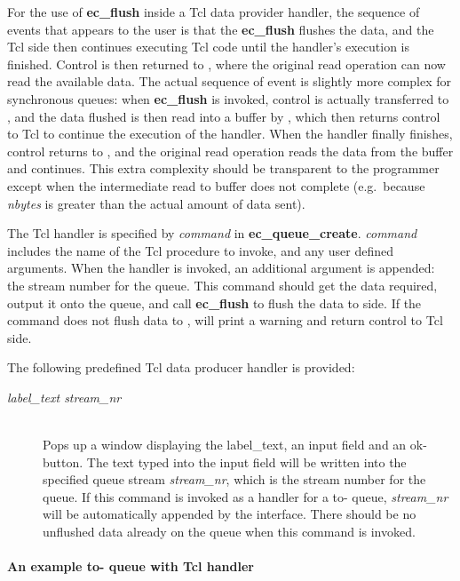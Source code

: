 For the use of {\bf ec_flush} inside a Tcl data provider handler, the
sequence of events that appears to the user is that the {\bf ec_flush}
flushes the data, and the Tcl side then continues executing Tcl code
until the handler's execution is finished. Control is then returned to
{\eclipse}, where the original read operation can now read the available
data. The actual sequence of event is slightly more complex for synchronous
queues: when {\bf
ec_flush} is invoked, control is actually transferred to {\eclipse}, and
the data flushed is then read into a buffer by {\eclipse}, which then
returns control to Tcl to continue the execution of the handler. When the
handler finally finishes, control returns to {\eclipse}, and the original
read operation reads the data from the buffer and continues. This extra
complexity should be transparent to the programmer except when the
intermediate {\eclipse} read to buffer does not complete (e.g.\ because
{\it nbytes\/} is greater than the actual amount of data sent). 

The Tcl handler is specified by {\it command\/} in {\bf
ec_queue_create}. {\it command\/} includes the name of the Tcl procedure to
invoke, and any user defined arguments. When the handler is invoked, an
additional argument is appended:
the {\eclipse} stream number for the queue. This command should get the
data required, output it onto the queue, and call {\bf ec_flush} to flush
the data to {\eclipse} side. If the command does not flush data to
{\eclipse}, {\eclipse} will print a warning and return control to Tcl side.

The following predefined Tcl data producer
handler is provided:

\begin{description}
\item[ {\it label_text stream_nr}]\ \\
        Pops up a window displaying the label_text, an input field
        and an ok-button. The text typed into the input field will
        be written into the specified queue stream {\it stream_nr}, which
        is the {\eclipse} stream number for the queue. If this command is
        invoked as a handler for a to-{\eclipse} queue, {\it stream_nr}
        will be automatically appended by the interface. There should be no
        unflushed data already on the queue when this command is invoked.
\end{description}

\paragraph{An example to-{\eclipse} queue with Tcl handler}


